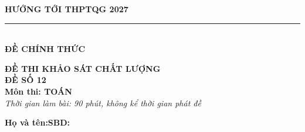 \documentclass[12pt,a4paper]{article}
\begin{document}
\noindent
\begin{minipage}[t]{0.40\textwidth}
    \centering
    \textbf{HƯỚNG TỚI THPTQG 2027}\\[-2pt]
    \rule{3.2cm}{0.6pt}\\[4pt]
    \textbf{ĐỀ CHÍNH THỨC}
\end{minipage}\hfill
\begin{minipage}[t]{0.58\textwidth}
    \centering
    \textbf{ĐỀ THI KHẢO SÁT CHẤT LƯỢNG}\\
    \textbf{ĐỀ SỐ 12}\\
    \textbf{Môn thi: TOÁN}\\
    \textit{\small Thời gian làm bài: 90 phút, không kể thời gian phát đề}
\end{minipage}
\vspace{0.2cm}
\noindent
\begin{minipage}[b]{0.78\textwidth}
    \textbf{Họ và tên:}\dotfill\textbf{SBD:}\makebox[3.5cm]{\dotfill}
\end{minipage}\hfill
\begin{minipage}[b]{0.20\textwidth}
    \hfill\setlength{\fboxrule}{0.8pt}
\end{minipage}
\vspace{0.2cm}
\end{document}
